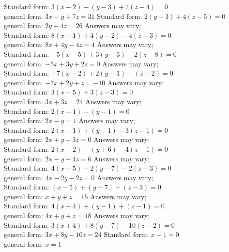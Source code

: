 \begin{Answer}
\Question Standard form: $3(x-2)-(y-3)+7(z-4)=0$\\
general form: $3x-y+7z=31$
\Question Standard form: $2(y-3)+4(z-5)=0$\\
general form: $2y+4z=26$
\Question Answers may vary;\\
Standard form: $8(x-1)+4(y-2)-4(z-3)=0$\\
general form: $8x+4y-4z=4$
\Question Answers may vary;\\
Standard form: $-5(x-5)+3(y-3)+2(z-8)=0$\\
general form: $-5x+3y+2z=0$
\Question Answers may vary;\\
Standard form: $-7(x-2)+2(y-1)+(z-2)=0$\\
general form: $-7x+2y+z=-10$
\Question Answers may vary;\\
Standard form: $3(x-5)+3(z-3)=0$\\
general form: $3x+3z=24$
\Question Answers may vary;\\
Standard form: $2(x-1)-(y-1)=0$\\
general form: $2x-y=1$
\Question Answers may vary;\\
Standard form: $2(x-1)+(y-1)-3(z-1)=0$\\
general form: $2x+y-3z=0$
\Question Answers may vary;\\
Standard form: $2(x-2)-(y+6)-4(z-1)=0$\\
general form: $2x-y-4z=6$
\Question Answers may vary;\\
Standard form: $4(x-5)-2(y-7)-2(z-3)=0$\\
general form: $4x-2y-2z=0$
\Question Answers may vary;\\
Standard form: $(x-5)+(y-7)+(z-3)=0$\\
general form: $x+y+z=15$
\Question Answers may vary;\\
Standard form: $4(x-4)+(y-1)+(z-1)=0$\\
general form: $4x+y+z=18$
\Question Answers may vary;\\
Standard form: $3(x+4)+8(y-7)-10(z-2)=0$\\
general form: $3x+8y-10z=24$
\Question Standard form: $x-1=0$\\
general form: $x=1$



\end{Answer}

